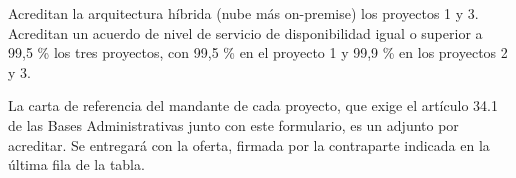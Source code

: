 \documentclass[11pt]{article}
\begin{document}
Acreditan la arquitectura híbrida (nube más on-premise) los proyectos 1 y 3. Acreditan un acuerdo de nivel de servicio de disponibilidad igual o superior a 99,5 \% los tres proyectos, con 99,5 \% en el proyecto 1 y 99,9 \% en los proyectos 2 y 3.

La carta de referencia del mandante de cada proyecto, que exige el artículo 34.1 de las Bases Administrativas junto con este formulario, es un adjunto por acreditar. Se entregará con la oferta, firmada por la contraparte indicada en la última fila de la tabla.

\ossFinalPage
\end{document}
